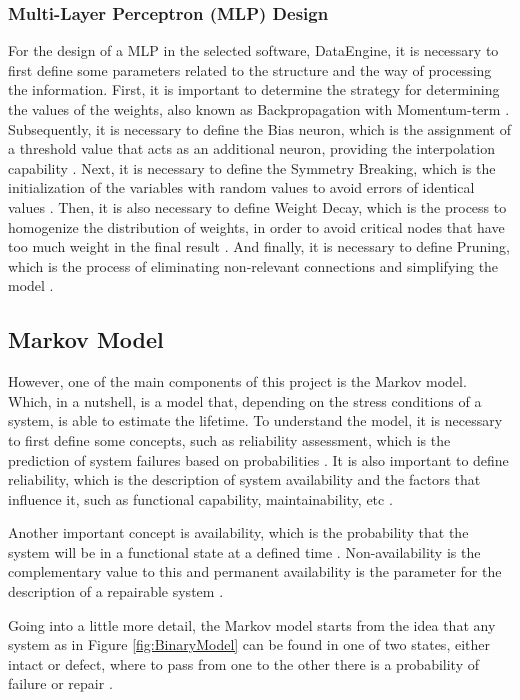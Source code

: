 \documentclass{article}
\begin{document}
\begin{doublespacing}
\subsubsection{Multi-Layer Perceptron (MLP) Design} 
\par For the design of a MLP in the selected software, DataEngine, it is necessary to first define some parameters related to the structure and the way of processing the information. First, it is important to determine the strategy for determining the values of the weights, also known as Backpropagation with Momentum-term \cite{kaestner:SCANN}. Subsequently, it is necessary to define the Bias neuron, which is the assignment of a threshold value that acts as an additional neuron, providing the interpolation capability \cite{kaestner:SCANN}. Next, it is necessary to define the Symmetry Breaking, which is the initialization of the variables with random values to avoid errors of identical values \cite{kaestner:SCANN}. Then, it is also necessary to define Weight Decay, which is the process to homogenize the distribution of weights, in order to avoid critical nodes that have too much weight in the final result \cite{kaestner:SCANN}. And finally, it is necessary to define Pruning, which is the process of eliminating non-relevant connections and simplifying the model \cite{kaestner:SCANN}.



\subsection{Markov Model} 

\par However, one of the main components of this project is the Markov model. Which, in a nutshell, is a model that, depending on the stress conditions of a system, is able to estimate the lifetime. To understand the model, it is necessary to first define some concepts, such as reliability assessment, which is the prediction of system failures based on probabilities \cite{kaestner:Mark}. It is also important to define reliability, which is the description of system availability and the factors that influence it, such as functional capability, maintainability, etc \cite{kaestner:Mark}.
\par Another important concept is availability, which is the probability that the system will be in a functional state at a defined time \cite{kaestner:Mark}. Non-availability is the complementary value to this and permanent availability is the parameter for the description of a repairable system \cite{kaestner:Mark}.
\par Going into a little more detail, the Markov model starts from the idea that any system as in Figure \ref{fig:BinaryModel} can be found in one of two states, either intact or defect, where to pass from one to the other there is a probability of failure or repair \cite{kaestner:Mark}.


\end{doublespacing}
\end{document}

